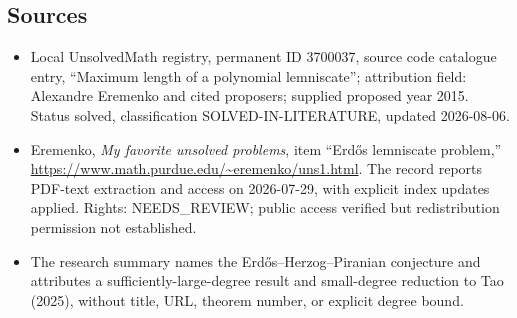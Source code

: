 \documentclass[11pt]{article}
\begin{document}
\subsection{Sources}
\begin{itemize}
\item Local UnsolvedMath registry, permanent ID 3700037, source code catalogue entry, ``Maximum length of a polynomial lemniscate''; attribution field: Alexandre Eremenko and cited proposers; supplied proposed year 2015. Status solved, classification SOLVED-IN-LITERATURE, updated 2026-08-06.
\item Eremenko, \emph{My favorite unsolved problems}, item ``Erd\H{o}s lemniscate problem,'' \url{https://www.math.purdue.edu/~eremenko/uns1.html}. The record reports PDF-text extraction and access on 2026-07-29, with explicit index updates applied. Rights: NEEDS\_REVIEW; public access verified but redistribution permission not established.
\item The research summary names the Erd\H{o}s--Herzog--Piranian conjecture and attributes a sufficiently-large-degree result and small-degree reduction to Tao (2025), without title, URL, theorem number, or explicit degree bound.
\end{itemize}
\end{document}
